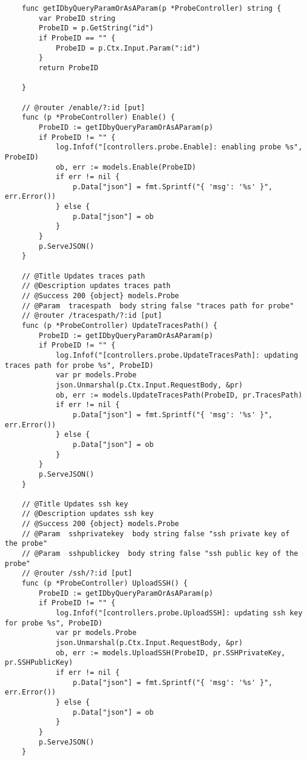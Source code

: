 \begin{verbatim}
    func getIDbyQueryParamOrAsAParam(p *ProbeController) string {
        var ProbeID string
        ProbeID = p.GetString("id")
        if ProbeID == "" {
            ProbeID = p.Ctx.Input.Param(":id")
        }
        return ProbeID
    
    }
    
    // @router /enable/?:id [put]
    func (p *ProbeController) Enable() {
        ProbeID := getIDbyQueryParamOrAsAParam(p)
        if ProbeID != "" {
            log.Infof("[controllers.probe.Enable]: enabling probe %s", ProbeID)
            ob, err := models.Enable(ProbeID)
            if err != nil {
                p.Data["json"] = fmt.Sprintf("{ 'msg': '%s' }", err.Error())
            } else {
                p.Data["json"] = ob
            }
        }
        p.ServeJSON()
    }
    
    // @Title Updates traces path
    // @Description updates traces path
    // @Success 200 {object} models.Probe
    // @Param  tracespath  body string false "traces path for probe"
    // @router /tracespath/?:id [put]
    func (p *ProbeController) UpdateTracesPath() {
        ProbeID := getIDbyQueryParamOrAsAParam(p)
        if ProbeID != "" {
            log.Infof("[controllers.probe.UpdateTracesPath]: updating traces path for probe %s", ProbeID)
            var pr models.Probe
            json.Unmarshal(p.Ctx.Input.RequestBody, &pr)
            ob, err := models.UpdateTracesPath(ProbeID, pr.TracesPath)
            if err != nil {
                p.Data["json"] = fmt.Sprintf("{ 'msg': '%s' }", err.Error())
            } else {
                p.Data["json"] = ob
            }
        }
        p.ServeJSON()
    }
    
    // @Title Updates ssh key
    // @Description updates ssh key
    // @Success 200 {object} models.Probe
    // @Param  sshprivatekey  body string false "ssh private key of the probe"
    // @Param  sshpublickey  body string false "ssh public key of the probe"
    // @router /ssh/?:id [put]
    func (p *ProbeController) UploadSSH() {
        ProbeID := getIDbyQueryParamOrAsAParam(p)
        if ProbeID != "" {
            log.Infof("[controllers.probe.UploadSSH]: updating ssh key for probe %s", ProbeID)
            var pr models.Probe
            json.Unmarshal(p.Ctx.Input.RequestBody, &pr)
            ob, err := models.UploadSSH(ProbeID, pr.SSHPrivateKey, pr.SSHPublicKey)
            if err != nil {
                p.Data["json"] = fmt.Sprintf("{ 'msg': '%s' }", err.Error())
            } else {
                p.Data["json"] = ob
            }
        }
        p.ServeJSON()
    }
    

\end{verbatim}

